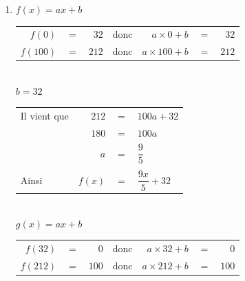 \begin{enumerate}
\item $f(x) = ax +b $ \\

\begin{tabular}{r@{$\;$}c@{$\;$}rcr@{$\;$}c@{$\;$}r}
$f(0) $    & $=$ & $ 32$  & donc & $a \times 0 +b $ & $=$ & $32$ \\
$f (100) $ & $=$ & $ 212$ & donc & $a \times 100 +b $ & $=$ & $212$ \\
\end{tabular}\\

$b=32$ \\

\begin{tabular}{lr@{$\;$}c@{$\;$}l}
Il vient que & $212$   & $=$ & $ 100a +32 $ \\
             & $180$   & $=$ & $ 100a$ \\
             & $a$     & $=$ & $\dfrac{9}{5} $ \\
             &         &     &                   \\ 
Ainsi        & $f(x) $ & $=$ & $\dfrac{9x}{5}  +32 $ \\    
\end{tabular}\\

\newpage 
$g(x) = ax +b $ \\

\begin{tabular}{r@{$\;$}c@{$\;$}rcr@{$\;$}c@{$\;$}r}
$f(32) $    & $=$ & $ 0$  & donc & $a \times 32 +b $ & $=$ & $0$ \\
$f (212) $ & $=$ & $ 100$ & donc & $a \times 212 +b $ & $=$ & $100$ \\
\end{tabular}


\end{enumerate}
